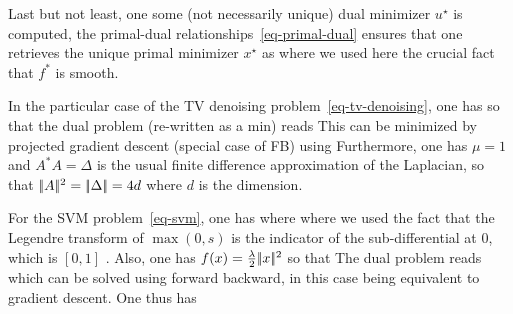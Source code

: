 Last but not least, one some (not necessarily unique) dual minimizer $u^\star$ is computed, the primal-dual relationships~\eqref{eq-primal-dual} ensures that one retrieves the unique primal minimizer $x^\star$ as
where we used here the crucial fact that $f^*$ is smooth.


\begin{exmp}[TV denoising]
In the particular case of the TV denoising problem~\eqref{eq-tv-denoising}, one has
so that the dual problem (re-written as a min) reads
This can be minimized by projected gradient descent (special case of FB) using
Furthermore, one has $\mu=1$ and $A^*A=\Delta$ is the usual finite difference approximation of the Laplacian, so that $|\!| A |\!|^2=|\!| \Delta |\!|=4d$ where $d$ is the dimension.
\end{exmp}


\begin{exmp}
	For the SVM problem~\eqref{eq-svm}, one has 
	where 
	where we used the fact that the Legendre transform of $\max(0,s)$ is the indicator of the sub-differential at 0, which is $[0,1]$ .
	Also, one has $f(x) = \frac{\lambda}{2}|\!| x |\!|^2$
	so that 
	The dual problem reads
	which can be solved using forward backward, in this case being equivalent to gradient descent. 
	One thus has 
\end{exmp}



